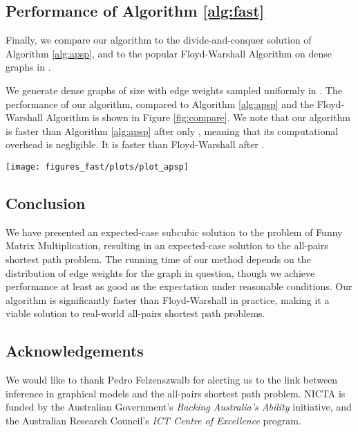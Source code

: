 \documentclass[a4paper,10pt]{article}
\begin{document}
\subsection{Performance of Algorithm \ref{alg:fast}}

Finally, we compare our algorithm to the divide-and-conquer solution of Algorithm \ref{alg:apsp}, and to the popular Floyd-Warshall Algorithm \cite{floyd} on dense graphs in .

We generate dense graphs of size  with edge weights sampled uniformly in . The performance of our algorithm, compared to Algorithm \ref{alg:apsp} and the Floyd-Warshall Algorithm is shown in Figure \ref{fig:compare}. We note that our algorithm is faster than Algorithm \ref{alg:apsp} after only , meaning that its computational overhead is negligible. It is faster than Floyd-Warshall after .

\begin{figure*}
 \begin{center}
  \texttt{[image: figures\_fast/plots/plot\_apsp]}\end{center}
\caption{The running time of our algorithm compared to the divide-and-conquer solution of Algorithm \ref{alg:apsp}, and the Floyd-Warshall Algorithm. The average of 10 trials is shown. All algorithms were implemented in Python.}
\label{fig:compare}
\end{figure*}

\subsection{Conclusion}

We have presented an expected-case subcubic solution to the problem of Funny Matrix Multiplication, resulting in an expected-case  solution to the all-pairs shortest path problem. The running time of our method depends on the distribution of edge weights for the graph in question, though we achieve performance at least as good as the expectation under reasonable conditions. Our algorithm is significantly faster than Floyd-Warshall in practice, making it a viable solution to real-world all-pairs shortest path problems.

\subsection*{Acknowledgements}

We would like to thank Pedro Felzenszwalb for alerting us to the link between inference in graphical models and the all-pairs shortest path problem. NICTA is funded by the Australian Government's \emph{Backing Australia's Ability} initiative, and the Australian Research Council's \emph{ICT Centre of Excellence} program.
\end{document}
